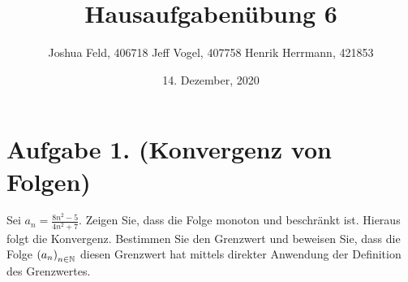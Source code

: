 \documentclass[german,12pt]{homework}
\title{Hausaufgabenübung 6}
\author{Joshua Feld, 406718 \quad Jeff Vogel, 407758 \quad Henrik Herrmann, 421853}
\date{14. Dezember, 2020}
\institute{RWTH Aachen University\\Center for Computational Engineering Science}
\newcommand{\NN}{\mathbb{N}}
\DeclarePairedDelimiter{\enbrace}{(}{)}
\begin{document}
    \maketitle

    \section*{Aufgabe 1. (Konvergenz von Folgen)}

    \begin{problem}
        Sei \(a_n = \frac{8n^2 - 5}{4n^2 + 7}\). Zeigen Sie, dass die Folge
        monoton und beschränkt ist. Hieraus folgt die Konvergenz. Bestimmen Sie
        den Grenzwert und beweisen Sie, dass die Folge \(\enbrace*{a_n}_{n \in
        \NN}\) diesen Grenzwert hat mittels direkter Anwendung der Definition
        des Grenzwertes.
    \end{problem}
\end{document}
